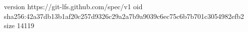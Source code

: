 version https://git-lfs.github.com/spec/v1
oid sha256:42a37db13b1af20c257d9326c29a2a7b9a9039c6ec75c6b7b701c3054982efb2
size 14119
